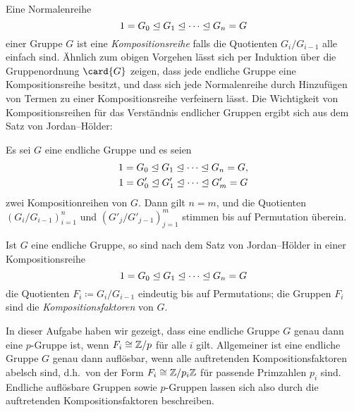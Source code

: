 \begin{remark}
  Eine Normalenreihe
  \[
                1
    =           G_0
    \trianglelefteq  G_1
    \trianglelefteq  \dotsb
    \trianglelefteq  G_n
    =           G
  \]
  einer Gruppe $G$ ist eine \emph{Kompositionsreihe} falls die Quotienten $G_i/G_{i-1}$ alle einfach sind.
  Ähnlich zum obigen Vorgehen lässt sich per Induktion über die Gruppenordnung $\card{G}$ zeigen, dass jede endliche Gruppe eine Kompositionsreihe besitzt, und dass sich jede Normalenreihe durch Hinzufügen von Termen zu einer Kompositionsreihe verfeinern lässt.
  Die Wichtigkeit von Kompositionsreihen für das Verständnis endlicher Gruppen ergibt sich aus dem Satz von Jordan--Hölder:
  
  \begin{theorem}
    Es sei $G$ eine endliche Gruppe und es seien
    \begin{gather*}
                  1
      =           G_0
      \trianglelefteq  G_1
      \trianglelefteq  \dotsb
      \trianglelefteq  G_n
      =           G,
      \\
                  1
      =           G'_0
      \trianglelefteq  G'_1
      \trianglelefteq  \dotsb
      \trianglelefteq  G'_m
      =           G
    \end{gather*}
    zwei Kompositionreihen von $G$.
    Dann gilt $n = m$, und die Quotienten $(G_i/G_{i-1})_{i=1}^n$ und $(G'_j/G'_{j-1})_{j=1}^m$ stimmen bis auf Permutation überein.
  \end{theorem}
  
  Ist $G$ eine endliche Gruppe, so sind nach dem Satz von Jordan--Hölder in einer Kompositionsreihe
  \[
                1
    =           G_0
    \trianglelefteq  G_1
    \trianglelefteq  \dotsb
    \trianglelefteq  G_n
    =           G
  \]
  die Quotienten $F_i \coloneqq G_i/G_{i-1}$ eindeutig bis auf Permutations;
  die Gruppen $F_i$ sind die \emph{Kompositionsfaktoren} von $G$.
  
  In dieser Aufgabe haben wir gezeigt, dass eine endliche Gruppe $G$ genau dann eine $p$-Gruppe ist, wenn $F_i \cong \mathbb{Z}/p$ für alle $i$ gilt.
  Allgemeiner ist eine endliche Gruppe $G$ genau dann auflösbar, wenn alle auftretenden Kompositionsfaktoren abelsch sind, d.h.\ von der Form $F_i \cong \mathbb{Z}/p_i\mathbb{Z}$ für passende Primzahlen $p_i$ sind.
  Endliche auflösbare Gruppen sowie $p$-Gruppen lassen sich also durch die auftretenden Kompositionsfaktoren beschreiben.
\end{remark}





